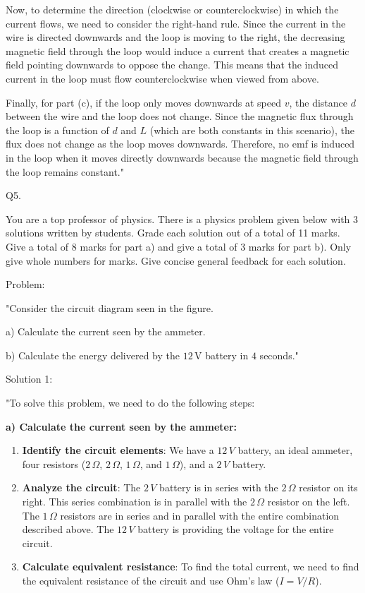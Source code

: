 Now, to determine the direction (clockwise or counterclockwise) in which the current flows, we need to consider the right-hand rule. Since the current in the wire is directed downwards and the loop is moving to the right, the decreasing magnetic field through the loop would induce a current that creates a magnetic field pointing downwards to oppose the change. This means that the induced current in the loop must flow counterclockwise when viewed from above.

Finally, for part (c), if the loop only moves downwards at speed \( v \), the distance \( d \) between the wire and the loop does not change. Since the magnetic flux through the loop is a function of \( d \) and \( L \) (which are both constants in this scenario), the flux does not change as the loop moves downwards. Therefore, no emf is induced in the loop when it moves directly downwards because the magnetic field through the loop remains constant."



                              Q5. 

You are a top professor of physics. There is a physics problem given below with 3 solutions written by students. Grade each solution out of a total of 11 marks. Give a total of 8 marks for part a) and give a total of 3 marks for part b). Only give whole numbers for marks. Give concise general feedback for each solution. 

Problem:

"Consider the circuit diagram seen in the figure. 

    a) Calculate the current seen by the ammeter.

    b) Calculate the energy delivered by the \(12\, \text{V}\) battery in \(4\) seconds."

Solution 1:

"To solve this problem, we need to do the following steps:

\textbf{a) Calculate the current seen by the ammeter:}

\begin{enumerate}
  \item \textbf{Identify the circuit elements}: We have a \(12\,V\) battery, an ideal ammeter, four resistors (\(2\,\Omega\), \(2\,\Omega\), \(1\,\Omega\), and \(1\,\Omega\)), and a \(2\,V\) battery.
  \item \textbf{Analyze the circuit}: The \(2\,V\) battery is in series with the \(2\,\Omega\) resistor on its right. This series combination is in parallel with the \(2\,\Omega\) resistor on the left. The \(1\,\Omega\) resistors are in series and in parallel with the entire combination described above. The \(12\,V\) battery is providing the voltage for the entire circuit.
  \item \textbf{Calculate equivalent resistance}: To find the total current, we need to find the equivalent resistance of the circuit and use Ohm's law (\(I = V/R\)).
\end{enumerate}

